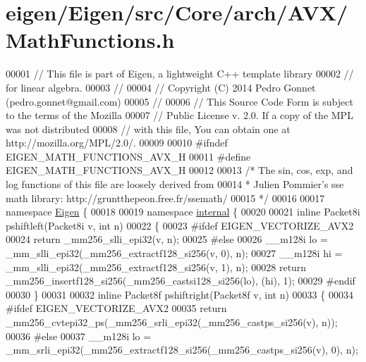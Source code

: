 \hypertarget{eigen_2_eigen_2src_2_core_2arch_2_a_v_x_2_math_functions_8h_source}{}\section{eigen/\+Eigen/src/\+Core/arch/\+A\+V\+X/\+Math\+Functions.h}
\label{eigen_2_eigen_2src_2_core_2arch_2_a_v_x_2_math_functions_8h_source}

\begin{DoxyCode}
00001 \textcolor{comment}{// This file is part of Eigen, a lightweight C++ template library}
00002 \textcolor{comment}{// for linear algebra.}
00003 \textcolor{comment}{//}
00004 \textcolor{comment}{// Copyright (C) 2014 Pedro Gonnet (pedro.gonnet@gmail.com)}
00005 \textcolor{comment}{//}
00006 \textcolor{comment}{// This Source Code Form is subject to the terms of the Mozilla}
00007 \textcolor{comment}{// Public License v. 2.0. If a copy of the MPL was not distributed}
00008 \textcolor{comment}{// with this file, You can obtain one at http://mozilla.org/MPL/2.0/.}
00009 
00010 \textcolor{preprocessor}{#ifndef EIGEN\_MATH\_FUNCTIONS\_AVX\_H}
00011 \textcolor{preprocessor}{#define EIGEN\_MATH\_FUNCTIONS\_AVX\_H}
00012 
00013 \textcolor{comment}{/* The sin, cos, exp, and log functions of this file are loosely derived from}
00014 \textcolor{comment}{ * Julien Pommier's sse math library: http://gruntthepeon.free.fr/ssemath/}
00015 \textcolor{comment}{ */}
00016 
00017 \textcolor{keyword}{namespace }\hyperlink{namespace_eigen}{Eigen} \{
00018 
00019 \textcolor{keyword}{namespace }\hyperlink{namespaceinternal}{internal} \{
00020 
00021 \textcolor{keyword}{inline} Packet8i pshiftleft(Packet8i v, \textcolor{keywordtype}{int} n)
00022 \{
00023 \textcolor{preprocessor}{#ifdef EIGEN\_VECTORIZE\_AVX2}
00024   \textcolor{keywordflow}{return} \_mm256\_slli\_epi32(v, n);
00025 \textcolor{preprocessor}{#else}
00026   \_\_m128i lo = \_mm\_slli\_epi32(\_mm256\_extractf128\_si256(v, 0), n);
00027   \_\_m128i hi = \_mm\_slli\_epi32(\_mm256\_extractf128\_si256(v, 1), n);
00028   \textcolor{keywordflow}{return} \_mm256\_insertf128\_si256(\_mm256\_castsi128\_si256(lo), (hi), 1);
00029 \textcolor{preprocessor}{#endif}
00030 \}
00031 
00032 \textcolor{keyword}{inline} Packet8f pshiftright(Packet8f v, \textcolor{keywordtype}{int} n)
00033 \{
00034 \textcolor{preprocessor}{#ifdef EIGEN\_VECTORIZE\_AVX2}
00035   \textcolor{keywordflow}{return} \_mm256\_cvtepi32\_ps(\_mm256\_srli\_epi32(\_mm256\_castps\_si256(v), n));
00036 \textcolor{preprocessor}{#else}
00037   \_\_m128i lo = \_mm\_srli\_epi32(\_mm256\_extractf128\_si256(\_mm256\_castps\_si256(v), 0), n);

\end{DoxyCode}
